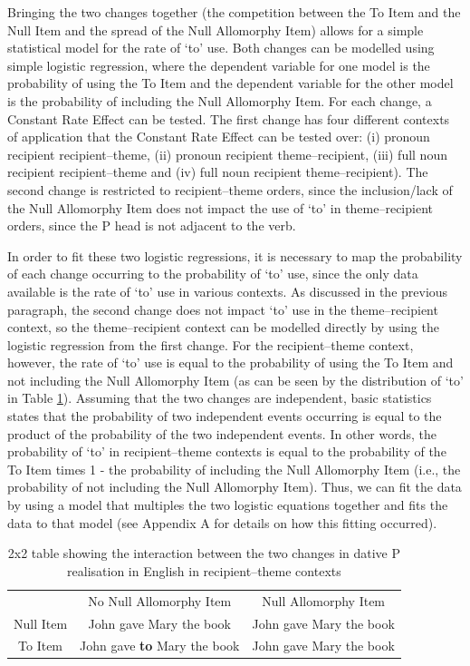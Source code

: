 	Bringing the two changes together (the competition between the To Item and the Null Item and the spread of the Null Allomorphy Item) allows for a simple statistical model for the rate of `to' use. Both changes can be modelled using simple logistic regression, where the dependent variable for one model is the probability of using the To Item and the dependent variable for the other model is the probability of including the Null Allomorphy Item. For each change, a Constant Rate Effect can be tested. The first change has four different contexts of application that the Constant Rate Effect can be tested over: (i) pronoun recipient recipient--theme, (ii) pronoun recipient theme--recipient, (iii) full noun recipient recipient--theme and (iv) full noun recipient theme--recipient). The second change is restricted to recipient--theme orders, since the inclusion/lack of the Null Allomorphy Item does not impact the use of `to' in theme--recipient orders, since the P head is not adjacent to the verb. 

	In order to fit these two logistic regressions, it is necessary to map the probability of each change occurring to the probability of `to' use, since the only data available is the rate of `to' use in various contexts. As discussed in the previous paragraph, the second change does not impact `to' use in the theme--recipient context, so the theme--recipient context can be modelled directly by using the logistic regression from the first change. For the recipient--theme context, however, the rate of `to' use is equal to the probability of using the To Item and not including the Null Allomorphy Item (as can be seen by the distribution of `to' in Table \ref{tab:2x2int}). Assuming that the two changes are independent, basic statistics states that the probability of two independent events occurring is equal to the product of the probability of the two independent events. In other words, the probability of `to' in recipient--theme contexts is equal to the probability of the To Item times 1 - the probability of including the Null Allomorphy Item (i.e., the probability of not including the Null Allomorphy Item). Thus, we can fit the data by using a model that multiples the two logistic equations together and fits the data to that model (see Appendix A for details on how this fitting occurred).

	\begin{table}[ht!]
		\begin{tabular}{ccc}
					& No Null Allomorphy Item & Null Allomorphy Item\\
			Null Item	& John gave Mary the book & John gave Mary the book\\
			To Item 	& John gave \textbf{to} Mary the book & John gave Mary the book\\
		\end{tabular}
		\caption{2x2 table showing the interaction between the two changes in dative P realisation in English in recipient--theme contexts}
		\label{tab:2x2int}
	\end{table}

